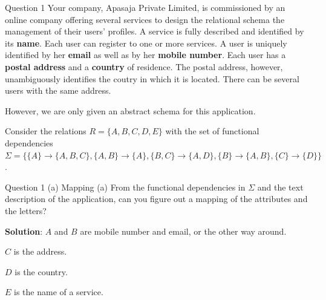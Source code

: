 \begin{frame}[fragile]{Question 1}
Your company, Apasaja Private Limited, is commissioned by an online company offering several services to design the relational schema the management of their users' profiles. A service is fully described and identified by its \textbf{name}. Each user can register to one or more services. A user is uniquely identified by her \textbf{email} as well as by her \textbf{mobile number}. Each user has a \textbf{postal address} and a \textbf{country} of residence. The postal address, however, unambiguously identifies the coutry in which it is located. There can be several users with the same address.\vspace{5pt}

However, we are only given an abstract schema for this application. \vspace{5pt}

Consider the relations $R=\{A, B, C, D, E\}$ with the set of functional dependencies $\Sigma=\{\{A\} \rightarrow \{A, B, C\}, \{A, B\} \rightarrow \{A\}, \{B, C\} \rightarrow \{A, D\}, \{B\} \rightarrow \{A, B\}, \{C\} \rightarrow \{D\}\}$.\vspace{5pt}
\end{frame}

\begin{frame}[fragile]{Question 1 (a) Mapping}
(a) From the functional dependencies in $\Sigma$ and the text description of the application, can you figure out a mapping of the attributes and the letters? \vspace{15pt}

\textbf{Solution}: $A$ and $B$ are mobile number and email, or the other way around.\vspace{5pt}

$C$ is the address.\vspace{5pt}

$D$ is the country.\vspace{5pt}

$E$ is the name of a service.\vspace{5pt}
\end{frame}

